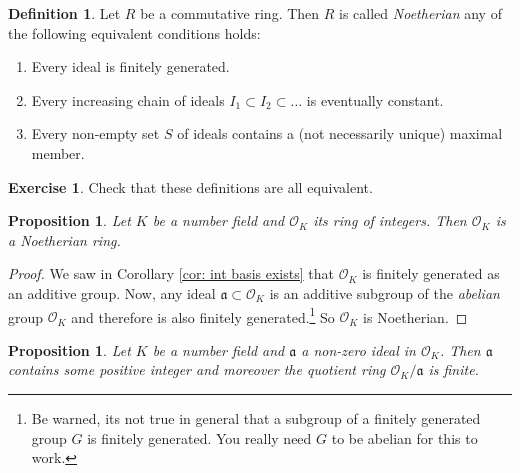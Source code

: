 \documentclass[11pt,a4paper]{report}
\theoremstyle{plain}
\newtheorem{prop}[subsection]{Proposition}
\theoremstyle{definition}
\newtheorem{defn}[subsection]{Definition}
\theoremstyle{definition}
\newtheorem{rmrk}[subsection]{Remark}
\newtheorem{question}[subsection]{Exercise}
\def \OO {\mathcal{O}}
\def\gotha{\mathfrak{a}}
\begin{document}
\begin{defn}\label{defn: noeth ring}
Let $R$ be a commutative ring. Then $R$ is called \textit{Noetherian} any of the following equivalent conditions holds:

\begin{enumerate}
	\item 	 Every ideal is finitely generated.
	\item Every increasing chain of ideals $I_1 \subset I_2 \subset \dots$ is eventually constant.
	\item Every non-empty set $S$ of ideals contains a (not necessarily unique) maximal member.	
\end{enumerate}

\end{defn}

\begin{question}
Check that these definitions are all equivalent.
\end{question}


\begin{prop}\label{prop: ring of ints is noeth}
Let $K$ be a number field and $\OO_K$ its ring of integers. Then $\OO_K$ is a Noetherian ring.
\end{prop}

\begin{proof}
We saw in Corollary \ref{cor: int basis exists} that $\OO_K$ is finitely generated as an additive group. Now, any ideal $\gotha \subset \OO_K$ is an additive subgroup of the \textit{abelian} group $\OO_K$ and therefore is also finitely generated.\footnote{Be warned, its not true in general that a subgroup of a finitely generated group $G$ is finitely generated. You really need $G$ to be abelian for this to work.} So $\OO_K$ is Noetherian.
\end{proof}





\begin{prop}\label{prop: quot of ideal is finite}
Let $K$ be a number field and $\gotha$ a non-zero ideal in $\OO_K$. Then $\gotha$ contains some positive integer and moreover the quotient ring $\OO_K /\gotha$ is finite.
\end{prop}
\end{document}
